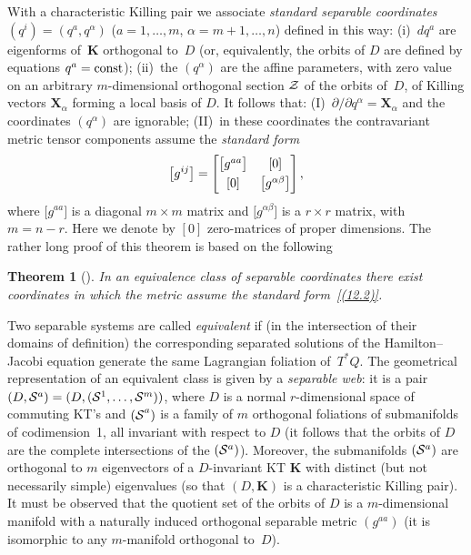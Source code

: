 \documentclass[pdftex]{sigma}
\def\bs{\boldsymbol}
\numberwithin{equation}{section}
\newtheorem{Theorem}{Theorem}[section]
 { \theoremstyle{definition}
\newtheorem{Notation}[Theorem]{Notation}
\newtheorem{Example}[Theorem]{Example}
\newtheorem{Remark}[Theorem]{Remark}
\newtheorem{Remarks}[Theorem]{Remarks}
 }
\begin{document}
With a characteristic Killing pair we associate {\it standard separable coordinates} $(q^i)=(q^a,q^\alpha)$
($a=1,\ldots,m$, $\alpha=m+1,\ldots, n$) def\/ined in this way:
(i)~$dq^a$ are eigenforms of~$\bs K$ orthogonal to~$D$ (or, equivalently, the orbits of $D$ are def\/ined by equations $q^a={\rm const}$); (ii)~the $(q^\alpha)$ are the af\/f\/ine parameters, with zero value on an arbitrary $m$-dimensional orthogonal section $\cal Z$  of the orbits of~$D$, of Killing vectors $\bs X_\alpha$ forming a local basis of $D$. It follows that: (I)~$\partial/\partial q^\alpha=\bs X_\alpha$ and the coordinates $(q^\alpha)$ are ignorable;
(II)~in these coordinates the contravariant metric tensor components assume the {\it standard form}
\begin{gather}
\big[g^{ij}\big]=
\bmatrix \big[g^{aa}\big] & [0]
\\[3pt]
 [0] & \big[g^{\alpha\beta}\big] \cr \endbmatrix,
\label{(12.2)}
\end{gather}
where $\big[g^{aa}\big]$ is a diagonal $m\times m$ matrix and $\big[ g^{\alpha\beta}\big]$ is a $r\times r$ matrix, with $m=n-r$. Here we denote by $[0]$ zero-matrices of proper dimensions. The rather long proof of this theorem is based on the following

\begin{Theorem}[\cite{Benenti-1980}]\label{t:12.2}
In an equivalence class of separable coordinates there exist coordinates in which the metric assume the standard form~\eqref{(12.2)}.
\end{Theorem}

Two separable systems are called {\it equivalent} if (in the intersection of their domains of def\/i\-ni\-tion) the corresponding separated solutions of the Hamilton--Jacobi equation generate the same Lagrangian foliation of~$T^*Q$.
The geometrical representation of an equivalent class is given by
a {\it separable web}: it is a pair $(D,{\cal S}^a)=(D, ({\cal S}^1,\ldots,{\cal S}^m))$, where $D$ is a normal $r$-dimensional space of commuting  KT's and ${(\cal S}^a)$ is a family of $m$ orthogonal foliations
of submanifolds of codimension~1, all invariant with respect to  $D$ (it follows that the orbits of $D$ are the complete intersections of the $({\cal S}^a)$). Moreover, the submanifolds $({\cal S}^a)$ are orthogonal to $m$ eigenvectors of a $D$-invariant KT $\bs K$ with distinct (but not necessarily simple) eigenvalues (so that $(D,\bs K)$ is a characteristic Killing pair).
It must be observed that the quotient set of the orbits of $D$ is a $m$-dimensional manifold with a naturally induced orthogonal separable metric $(g^{aa})$ (it is isomorphic to any $m$-manifold orthogonal to~$D$).
\end{document}
